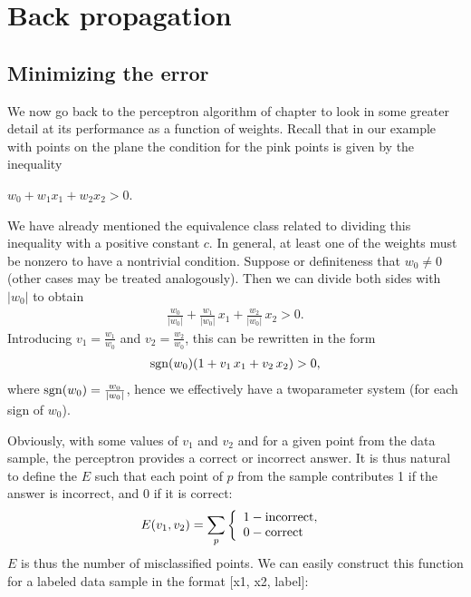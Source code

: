 \documentclass[letterpaper,10pt,english]{jupyterBook}
\begin{document}
\chapter{Back propagation}
\label{\detokenize{docs/backprop:back-propagation}}\label{\detokenize{docs/backprop::doc}}

\section{Minimizing the error}
\label{\detokenize{docs/backprop:minimizing-the-error}}
\sphinxAtStartPar
We now go back to the perceptron algorithm of chapter {\hyperref[\detokenize{docs/perceptron:perc-lab}]{}} to look in some greater detail at its performance as a function of weights. Recall that in our example with points on the plane the condition for the pink points is given by the inequality

\sphinxAtStartPar
\(w_0+w_1 x_1 + w_2 x_2 > 0\).

\sphinxAtStartPar
We have already mentioned the equivalence class related to dividing this inequality with a
positive constant \(c\). In general, at least one of the weights must be nonzero to have a nontrivial condition. Suppose or definiteness that \(w_0 \neq 0\) (other cases may be treated analogously). Then we can divide both sides with \(|w_0|\) to obtain
\begin{equation*}
\begin{split}\frac{w_0}{|w_0|}+\frac{w_1}{|w_0|} \, x_1 + \frac{w_2}{|w_0|} \, x_2 > 0. \end{split}
\end{equation*}
\sphinxAtStartPar
Introducing \(v_1=\frac{w_1}{w_0}\) and \(v_2=\frac{w_2}{w_0}\), this can be rewritten in the form
\begin{equation*}
\begin{split}{\rm sgn}(w_0)( 1+v_1 \, x_1 +v_2 \, x_2) > 0,\end{split}
\end{equation*}
\sphinxAtStartPar
where \({\rm sgn}(w_0) = \frac{w_0}{|w_0|}\), hence we effectively have a two\sphinxhyphen{}parameter system (for each sign of \(w_0\)).

\sphinxAtStartPar
Obviously, with some values of \( v_1 \) and \( v_2 \) and for a given point from the data sample, the perceptron provides a correct or incorrect answer. It is thus natural to define the  \(E\) such that each point of \(p\) from the sample contributes 1 if the answer is incorrect, and 0 if it is correct:
\begin{equation*}
\begin{split} E(v_1,v_2)=\sum_p \left\{ \begin{array}{ll} 1 -{\rm incorrect,~}\\ 0 -{\rm correct} \end{array}\right .\end{split}
\end{equation*}
\sphinxAtStartPar
\(E\) is thus the number of misclassified points. We can easily construct this function for a labeled data sample in the format {[}x1, x2, label{]}:
\end{document}
